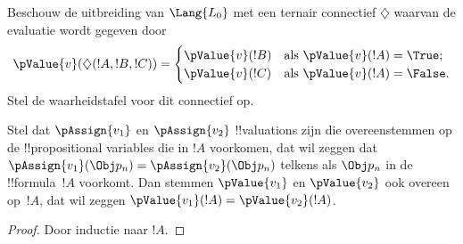 \documentclass[openany]{memoir}
\begin{document}
\begin{prob}
Beschouw de uitbreiding van $\Lang{L_0}$ met een ternair connectief
$\diamondsuit$ waarvan de evaluatie wordt gegeven door
\begin{gather*}
  \pValue{v}(\diamondsuit( !A , !B , !C ) ) = \begin{cases}
    \pValue{v}( !B ) &
    \text{als $\pValue{v}(!A) = \True$;}\\
    \pValue{v}( !C ) &
    \text{als $\pValue{v}(!A) = \False $}.
  \end{cases}
\end{gather*}
Stel de waarheidstafel voor dit connectief op.
\end{prob}

\begin{thm}
 Stel dat $\pAssign{v_1}$ en
$\pAssign{v_2}$ !!{valuation}s zijn die overeenstemmen op de
!!{propositional variable}s die in $!A$ voorkomen, dat wil zeggen dat
$\pAssign{v_1}(\Obj p_n) = \pAssign{v_2}(\Obj p_n)$ telkens als
$\Obj p_n$ in de !!{formula}~$!A$ voorkomt. Dan stemmen
$\pValue{v_1}$ en $\pValue{v_2}$ ook overeen op~$!A$, dat wil zeggen
$\pValue{v_1}(!A) = \pValue{v_2}(!A)$.
\end{thm}

\begin{proof}
Door inductie naar $!A$.
\end{proof}
\end{document}
